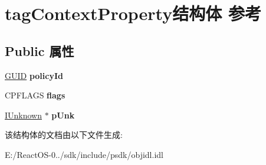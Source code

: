 \hypertarget{structtag_context_property}{}\section{tag\+Context\+Property结构体 参考}
\label{structtag_context_property}
\subsection*{Public 属性}
\begin{DoxyCompactItemize}
\item 
\mbox{\label{structtag_context_property_a14f8133d18a774b5d8a8e4059c3fb1a0}} 
\hyperlink{interface_g_u_i_d}{G\+U\+ID} {\bfseries policy\+Id}
\item 
\mbox{\label{structtag_context_property_a460777fa031a5bd64e533adeb0fd8439}} 
C\+P\+F\+L\+A\+GS {\bfseries flags}
\item 
\mbox{\label{structtag_context_property_ab69e00027673bd0bc8415b685c5a234a}} 
\hyperlink{interface_i_unknown}{I\+Unknown} $\ast$ {\bfseries p\+Unk}
\end{DoxyCompactItemize}


该结构体的文档由以下文件生成\+:\begin{DoxyCompactItemize}
\item 
E\+:/\+React\+O\+S-\/0../sdk/include/psdk/objidl.\+idl\end{DoxyCompactItemize}
